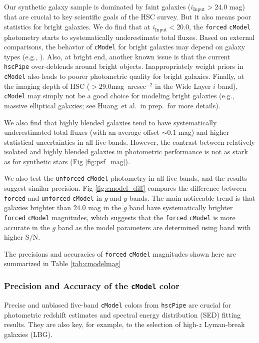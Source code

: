 \documentclass[useamsfonts]{pasj01}
\def\sb{mag~arcsec$^{-2}$}
\def\etal{{\ et al.~}}
\def\hscpipe{\texttt{hscPipe}}
\def\cmodel{\texttt{cModel}}
\def\forced{\texttt{forced}}
\def\unforced{\texttt{unforced}}
\def\s2n{{$\mathrm{S}/\mathrm{N}$}}
\begin{document}
    Our synthetic galaxy sample is dominated by faint galaxies 
    ($i_{\mathrm{Input}} > 24.0$ mag) that are crucial to key scientific goals of the 
    HSC survey.
    But it also means poor statistics for bright galaxies. 
    We do find that at $i_{\mathrm{Input}}<20.0$, the \forced{} \cmodel{} photometry 
    starts to systematically underestimate total fluxes. 
    Based on external comparisons, the behavior of \cmodel{} for bright galaxies may 
    depend on galaxy types (e.g., \citealt{HSCDR1}).  
    Also, at bright end, another known issue is that the current \hscpipe{}
    over-deblends around bright objects. 
    Inappropriately weight priors in \cmodel{} also leads to poorer photometric 
    quality for bright galaxies.  
    Finally, at the imaging depth of HSC ($>29.0$\sb{} in the Wide Layer $i$ band),  
    \cmodel{} may simply not be a good choice for modeling bright galaxies 
    (e.g., massive elliptical galaxies; see Huang\etal in prep.~for more details).

    We also find that highly blended galaxies tend to have systematically 
    underestimated total fluxes (with an average offset ${\sim}0.1$ mag) and 
    higher statistical uncertainties in all five bands. 
    However, the contrast between relatively isolated and highly blended galaxies
    in photometric performance is not as stark as for synthetic stars 
    (Fig \ref{fig:psf_mag}).

    We also test the \unforced{} \cmodel{} photometry in all five bands, and the
    results suggest similar precision.
    Fig \ref{fig:cmodel_diff} compares the difference between \forced{} and \unforced{} 
    \cmodel{} in $g$ and $y$ bands.  
    The main noticeable trend is that galaxies brighter than $24.0$ mag in the $g$ band 
    have systematically brighter \forced{} \cmodel{} magnitudes, which suggests that 
    the \forced{} \cmodel{} is more accurate in the $g$ band as the model parameters 
    are determined using band with higher \s2n{}.
    
	The precisions and accuracies of \forced{} \cmodel{} magnitudes shown here are 
	summarized in Table \ref{tab:cmodelmag}

\subsubsection{Precision and Accuracy of the \cmodel{} color}

    Precise and unbiased five-band \cmodel{} colors from \hscpipe{} are crucial for
    photometric redshift estimates and spectral energy distribution (SED) fitting 
    results. 
    They are also key, for example, to the selection of high-$z$ Lyman-break 
    galaxies (LBG).
\end{document}
